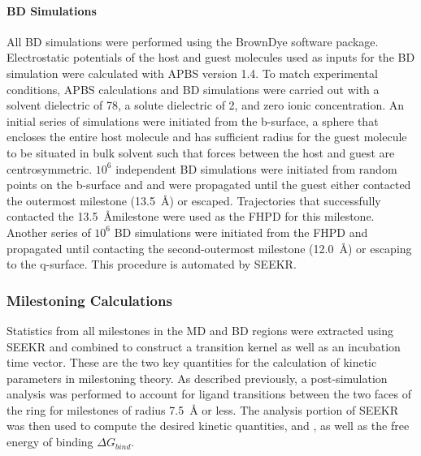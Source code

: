 \paragraph{BD Simulations}
All BD simulations were performed using the BrownDye software package\cite{Huber2010}.
Electrostatic potentials of the host and guest molecules used as inputs for the
BD simulation were calculated with APBS version 1.4\cite{Baker2001}. To match
experimental conditions, APBS calculations and BD simulations were carried out
with a solvent dielectric of 78, a solute dielectric of 2, and zero ionic concentration.
An initial series of simulations were initiated from the b-surface, a sphere that
encloses the entire host molecule and has sufficient radius for the guest molecule
to be situated in bulk solvent such that forces between the host and guest are centrosymmetric.
$10^6$ independent BD simulations were initiated from random points on the b-surface
and and were propagated until the guest either contacted the outermost milestone
(13.5~\AA) or escaped. Trajectories that successfully contacted the 13.5~\AA milestone
were used as the FHPD for this milestone. Another series of $10^6$ BD simulations
were initiated from the FHPD and propagated until contacting the second-outermost
milestone (12.0~\AA) or escaping to the q-surface. This procedure is automated by
SEEKR.

\subsubsection{Milestoning Calculations}
\par Statistics from all milestones in the MD and BD regions were extracted
using SEEKR and combined to construct a transition kernel as well as an incubation
time vector. These are the two key quantities for the calculation of kinetic
parameters in milestoning theory.\cite{Faradjian2004} As described previously,
a post-simulation analysis was performed to account for ligand transitions
between the two faces of the \bcd ring for milestones of radius 7.5~\AA
or less. The analysis portion of SEEKR was then used to compute the desired
kinetic quantities, \kon and \koff, as well as the free energy of binding $\Delta G_{bind}$.


